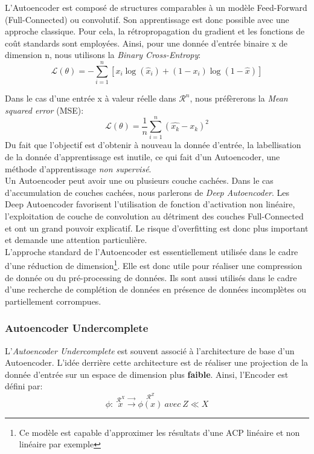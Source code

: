 \noindent L'Autoencoder est composé de structures comparables à un modèle Feed-Forward (Full-Connected) ou convolutif. Son apprentissage est donc possible avec une approche classique. Pour cela, la rétropropagation du gradient et les fonctions de coût standards sont employées. Ainsi, pour une donnée d'entrée binaire x de dimension n, nous utilisons la \textit{Binary Cross-Entropy}:
$$\mathcal{L}(\theta)= -\sum_{i=1}^n \left[x_i \log(\hat{x}_i) + (1-x_i) \log(1-\hat{x})\right]$$

\noindent Dans le cas d'une entrée x à valeur réelle dans $\mathcal{R}^n$, nous préfèrerons la \textit{Mean squared error} (MSE):
$$\mathcal{L}(\theta)= \frac{1}{n}\sum_{i=1}^n (\hat{x_k}-x_k)^2$$
\noindent Du fait que l'objectif est d'obtenir à nouveau la donnée d'entrée, la labellisation de la donnée d'apprentissage est inutile, ce qui fait d'un Autoencoder, une méthode d'apprentissage \textit{non supervisé}.\\

\noindent Un Autoencoder peut avoir une ou plusieurs couche cachées. Dans le cas d'accumulation de couches cachées, nous parlerons de \textit{Deep Autoencoder}. Les Deep Autoencoder favorisent l'utilisation de fonction d'activation non linéaire, l'exploitation de couche de convolution au détriment des couches Full-Connected et ont un grand pouvoir explicatif. Le risque d'overfitting est donc plus important et demande une attention particulière.\\

\noindent L'approche standard de l'Autoencoder est essentiellement utilisée dans le cadre d'une réduction de dimension\footnote{Ce modèle est capable d'approximer les résultats d'une ACP linéaire et non linéaire par exemple}. Elle est donc utile pour réaliser une compression de donnée ou du pré-processing de données. Ils sont aussi utilisés dans le cadre d'une recherche de complétion de données en présence de données incomplètes ou partiellement corrompues.

\subsubsection{Autoencoder Undercomplete}
L'\textit{Autoencoder Undercomplete} est souvent associé à l'architecture de base d'un Autoencoder. L'idée derrière cette architecture est de réaliser une projection de la donnée d'entrée sur un espace de dimension plus \textbf{faible}. Ainsi, l'Encoder est défini par:
$$\phi: \ \stackrel{\mathcal{R}^X}{x} \stackrel{\rightarrow}{\longrightarrow} \stackrel{\mathcal{R}^Z}{\phi(x)} \ avec \ Z \ll X$$


